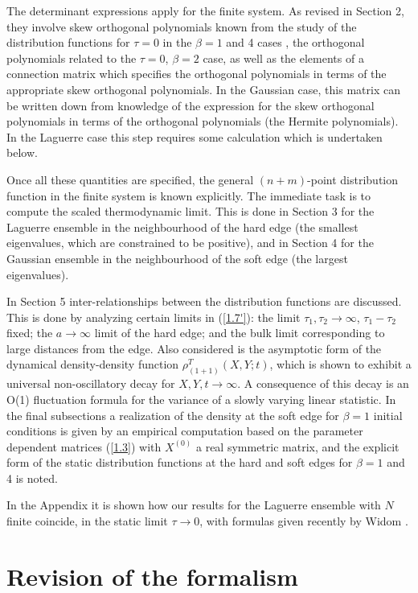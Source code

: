 The determinant 
expressions apply for the finite system. As revised in Section 2, they 
involve 
skew orthogonal polynomials known from the study of the distribution functions 
for $\tau = 0$ in the $\beta = 1$ and 4 cases \cite{NW91,NF95}, the orthogonal 
polynomials 
related to the $\tau = 0$, $\beta = 2$ case, as well as the elements of a 
connection matrix which specifies the orthogonal polynomials in terms of the 
appropriate 
skew orthogonal polynomials. In the Gaussian case, this matrix can be 
written 
down from knowledge of the expression for the skew orthogonal polynomials in 
terms of the 
orthogonal polynomials (the Hermite polynomials). In the Laguerre case this 
step requires some calculation which is undertaken below. 

Once all 
these quantities are specified, the general $(n + m)$-point distribution 
function in the finite system is known explicitly. 
The immediate task is to compute the scaled thermodynamic limit. This is
done in Section 3 for the Laguerre ensemble 
in the neighbourhood
of the hard edge (the smallest
eigenvalues, which are constrained to be positive), and in Section 4
for the Gaussian ensemble in the neighbourhood of the soft edge (the
largest eigenvalues).

In Section 5 inter-relationships between the distribution functions
are discussed. This is done by analyzing certain limits in (\ref{1.7'}):
the limit $\tau_1,\tau_2 \to \infty$, $\tau_1 - \tau_2$ fixed; the 
$a \to \infty$ limit of the hard edge; and the bulk limit corresponding to
large
distances from the edge. Also considered is the asymptotic form of
the dynamical density-density function $\rho_{(1+1)}^T(X,Y;t)$, which is
shown to exhibit a universal non-oscillatory decay for $X,Y,t \to \infty$.
A consequence of this decay is an O(1) fluctuation formula for the
variance of a slowly varying linear statistic. In the final subsections
a realization of the density at the soft edge for $\beta = 1$ initial
conditions is given by  an
empirical computation based on 
the parameter dependent matrices (\ref{1.3})
with $X^{(0)}$ a real symmetric matrix, and the explicit form of the
static distribution functions at the hard and soft edges for $\beta = 1$
and 4 is noted.

In the Appendix it is
shown how our results for the Laguerre ensemble with $N$ finite
coincide, in the static limit $\tau \to 0$, with formulas given recently
by Widom \cite{Wi98}.

\section{Revision of the formalism}
\setcounter{equation}{0}

